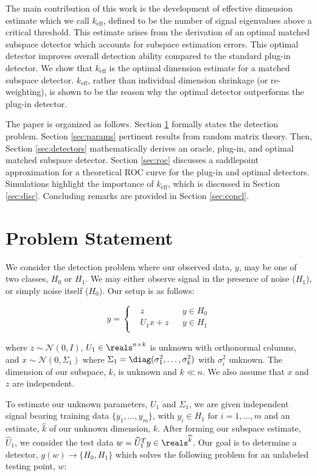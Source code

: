The main contribution of this work is the development of effective dimension estimate which we call $k_{\text{eff}}$, defined to be the number of signal eigenvalues above a critical threshold. This estimate arises from the derivation of an optimal matched subspace detector which accounts for subspace estimation errors. This optimal detector improves overall detection ability compared to the standard plug-in detector. We show that $k_{\text{eff}}$ is the optimal dimension estimate for a matched subspace detector. $k_{\text{eff}}$, rather than individual dimension shrinkage (or re-weighting), is shown to be the reason why the optimal detector outperforms the plug-in detector.

The paper is organized as follows. Section \ref{sec:prob} formally states the detection problem. Section \ref{sec:params} pertinent results from random matrix theory. Then, Section \ref{sec:detectors} mathematically derives an oracle, plug-in, and optimal matched subspace detector. Section \ref{sec:roc} discusses a saddlepoint approximation for a theoretical ROC curve for the plug-in and optimal detectors. Simulations highlight the importance of $k_{\text{eff}}$, which is discussed in Section \ref{sec:disc}. Concluding remarks are provided in Section \ref{sec:concl}.


\section{Problem Statement}\label{sec:prob}
We consider the detection problem where our observed data, $y$, may be one of two classes, $H_0$ or $H_1$. We may either observe signal in the presence of noise ($H_1$), or simply noise itself ($H_0$). Our setup is as follows:

\begin{equation}\label{eq:prob state}
y=\left\{
\begin{aligned}
&z
&& y\in H_0\\
&U_1x+z
&& y\in H_1\\
\end{aligned}\right.
\end{equation}

where $z\sim\mathcal{N}(0,I)$, $U_1\in\reals^{n\times k}$ is unknown with orthonormal columns, and $x\sim\mathcal{N}(0,\Sigma_1)$ where $\Sigma_1=\diag(\sigma_1^2,\dots,\sigma_k^2)$ with $\sigma_i^2$ unknown. The dimension of our subspace, $k$, is unknown and $k\ll n$. We also assume that $x$ and $z$ are independent.

To estimate our unknown parameters, $U_1$ and $\Sigma_1$, we are given independent signal bearing training data $\{y_1,\dots,y_m\}$, with $y_i\in H_1 \text{ for } i=1,\dots,m$ and an estimate, $\widehat{k}$ of our unknown dimension, $k$. After forming our subspace estimate, $\widehat{U}_1$,  we consider the test data $w=\widehat{U}_1^Ty\in\reals^{\widehat{k}}$. Our goal is to determine a detector, $g(w)\to\{H_0,H_1\}$ which solves the following problem for an unlabeled testing point, $w$:

